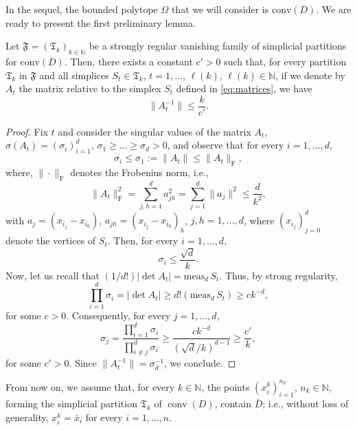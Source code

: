\documentclass[onefignum,onetabnum]{siamonline250211}
\newcommand{\conv}{\operatorname{conv}}
\newcommand{\bx}{\bar{x}}
\begin{document}
In the sequel, the bounded polytope $\Omega$ that we will consider is $\mathrm{conv}(D)$. We are ready to present the first preliminary lemma.
\begin{lemma}\label{lem:bound_invA} Let $\mathfrak{F}=(\mathfrak{T}_k)_{k\in\mathbb{N}}$ be a strongly regular vanishing family of simplicial partitions for $\mathrm{conv}(D)$. Then, there exists a constant $c'>0$ such that, for every partition $\mathfrak{T}_k$ in $\mathfrak{F}$ and all simplices $S_t\in \mathfrak{T}_k$, $t=1,\ldots, \, \ell(k)$, $\ell(k)\in\mathbb{N}$, if we denote by $A_t$ the matrix  relative to the simplex $S_t$ defined in \cref{eq:matrices}, we have
$$
\|A_t^{-1}\|\leq \frac{k}{c'}.
$$
\end{lemma}
\begin{proof}
Fix $t$ and consider the singular values of the matrix $A_t$, $\sigma(A_t)=(\sigma_i)_{i=1}^d$, $\sigma_1\geq\ldots\geq\sigma_d>0$, and observe that for every $i=1,\ldots,d$, 
$$
\sigma_i\leq\sigma_{1}:=\|A_t\|\leq\|A_t\|_{\text{F}},
$$ 
where, $\|\cdot\|_{\mathrm{F}}$ denotes the Frobenius norm, i.e.,
$$
\|A_t\|^2_{\text{F}}=\sum_{j,h=1}^d a_{jh}^2=\sum_{j=1}^d\|a_j\|^2\leq \frac{d}{k^2},
$$
with $a_{j}=(x_{i_j}-x_{i_0})$, $a_{jh}=(x_{i_j}-x_{i_0})_h$, $j,h=1,\ldots,d$, where $(x_{i_j})_{j=0}^d$ denote the vertices of $S_t$. Then, for every $i=1,\ldots,d$,
\begin{equation}
    \sigma_i\leq\frac{\sqrt{d}}{k}.
\end{equation}
Now, let us recall that $(1/d!)|\det A_t|=\mathrm{meas}_d\, S_t$. Thus, by strong regularity,
$$
\prod_{i=1}^d\sigma_i=|\det A_t|\geq d! (\mathrm{meas}_d\, S_t)\geq ck^{-d},
$$ 
for some $c>0$. Consequently, for every $j=1,\dots, d$, 
$$
\sigma_j=\frac{\prod_{i=1}^d\sigma_i}{\prod_{i\neq j}^d\sigma_i}\geq \frac{c k^{-d}}{(\sqrt{d}/k)^{d-1}}\geq \frac{c'}{k},
$$
for some $c'>0$. Since $\|A_t^{-1}\|=\sigma_{d}^{-1}$, we conclude.
\end{proof}

From now on, we assume that, for every $k\in\mathbb{N}$, the points $(x_i^k)_{i=1}^{n_k}$, $n_k\in\mathbb{N}$, forming the simplicial partition $\mathfrak{T}_k$ of $\conv(D)$, contain $\bar D$; i.e., without loss of generality, $x_i^k=\bx_i$ for every $i=1,\ldots, n$.
 
\end{document}
